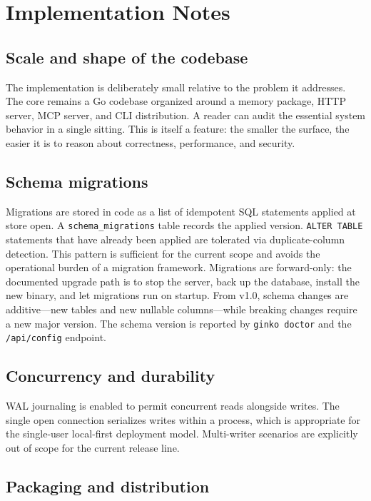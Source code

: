\documentclass[11pt,a4paper]{article}
\begin{document}
\section{Implementation Notes}

\subsection{Scale and shape of the codebase}

The implementation is deliberately small relative to the problem it addresses. The core remains a Go codebase organized around a memory package, HTTP server, MCP server, and CLI distribution. A reader can audit the essential system behavior in a single sitting. This is itself a feature: the smaller the surface, the easier it is to reason about correctness, performance, and security.

\subsection{Schema migrations}

Migrations are stored in code as a list of idempotent SQL statements applied at store open. A \texttt{schema\_migrations} table records the applied version. \texttt{ALTER TABLE} statements that have already been applied are tolerated via duplicate-column detection. This pattern is sufficient for the current scope and avoids the operational burden of a migration framework. Migrations are forward-only: the documented upgrade path is to stop the server, back up the database, install the new binary, and let migrations run on startup. From v1.0, schema changes are additive---new tables and new nullable columns---while breaking changes require a new major version. The schema version is reported by \texttt{ginko doctor} and the \texttt{/api/config} endpoint.

\subsection{Concurrency and durability}

WAL journaling is enabled to permit concurrent reads alongside writes. The single open connection serializes writes within a process, which is appropriate for the single-user local-first deployment model. Multi-writer scenarios are explicitly out of scope for the current release line.

\subsection{Packaging and distribution}
\end{document}
